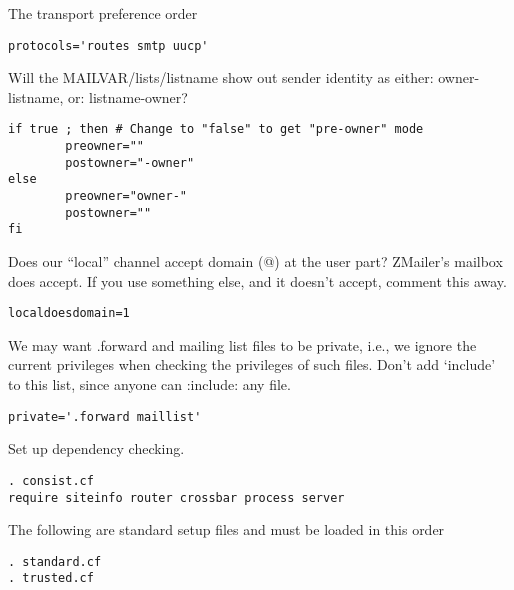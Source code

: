 The transport preference order

\begin{tscreen}
\begin{verbatim}
protocols='routes smtp uucp'
\end{verbatim}
\end{tscreen}


Will the  MAILVAR/lists/listname  show out sender identity as
either:  owner-listname, or:  listname-owner?

\begin{tscreen}
\begin{verbatim}
if true ; then # Change to "false" to get "pre-owner" mode
        preowner=""
        postowner="-owner"
else
        preowner="owner-"
        postowner=""
fi
\end{verbatim}
\end{tscreen}


Does our ``local'' channel accept domain (@) at the user part?
ZMailer's mailbox does accept.  If you use something else, and
it doesn't accept, comment this away.

\begin{tscreen}
\begin{verbatim}
localdoesdomain=1
\end{verbatim}
\end{tscreen}


We may want .forward and mailing list files to be private, i.e., we ignore
the current privileges when checking the privileges of such files.
Don't add `include' to this list, since anyone can :include: any file.

\begin{tscreen}
\begin{verbatim}
private='.forward maillist'
\end{verbatim}
\end{tscreen}


Set up dependency checking.

\begin{tscreen}
\begin{verbatim}
. consist.cf
require siteinfo router crossbar process server
\end{verbatim}
\end{tscreen}


The following are standard setup files and must be loaded in this order

\begin{tscreen}
\begin{verbatim}
. standard.cf
. trusted.cf
\end{verbatim}
\end{tscreen}


